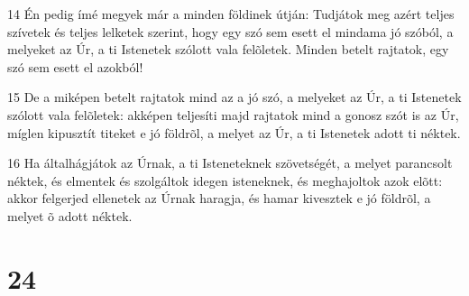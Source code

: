 \par 14 Én pedig ímé megyek már a minden földinek útján: Tudjátok meg azért teljes szívetek és teljes lelketek szerint, hogy egy szó sem esett  el mindama jó szóból, a melyeket az Úr, a ti Istenetek szólott vala felõletek. Minden betelt rajtatok, egy szó sem esett el azokból!
\par 15 De a miképen betelt rajtatok mind az a jó szó, a melyeket az Úr, a ti Istenetek szólott vala felõletek: akképen teljesíti majd rajtatok mind a gonosz szót is az Úr, míglen kipusztít titeket e jó földrõl, a melyet az Úr, a ti Istenetek adott ti néktek.
\par 16 Ha általhágjátok az Úrnak, a ti Isteneteknek szövetségét, a melyet parancsolt néktek, és elmentek és szolgáltok idegen isteneknek, és meghajoltok azok elõtt: akkor felgerjed ellenetek az Úrnak haragja, és hamar kivesztek e jó földrõl, a melyet õ adott néktek.

\chapter{24}

